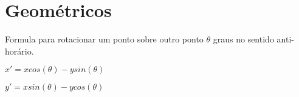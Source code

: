 \section{Geométricos} %
\label{sec:geometricos}

Formula para rotacionar um ponto sobre outro ponto $\theta$ graus no
sentido anti-horário.

\begin{math}
x' = x cos(\theta) - y sin(\theta)
\end{math}

\begin{math}
y' = x sin(\theta) - y cos(\theta)
\end{math}


